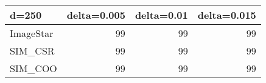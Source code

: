 \begin{tabular}{lrrr}
\hline
 d=250     &   delta=0.005 &   delta=0.01 &   delta=0.015 \\
\hline
 ImageStar &            99 &           99 &            99 \\
 SIM\_CSR   &            99 &           99 &            99 \\
 SIM\_COO   &            99 &           99 &            99 \\
\hline
\end{tabular}
